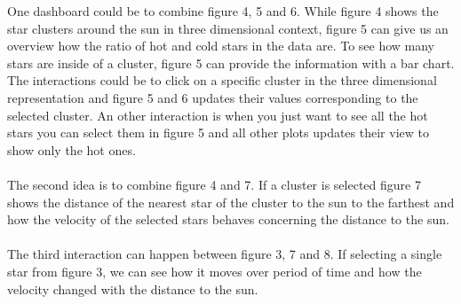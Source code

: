\documentclass{article}
\begin{document}
One dashboard could be to combine figure 4, 5 and 6. While figure 4 shows the star clusters around the sun in three dimensional context, figure 5 can give us an overview how the ratio of hot and cold stars in the data are. To see how many stars are inside of a cluster, figure 5 can provide the information with a bar chart. The interactions could be to click on a specific cluster in the three dimensional representation and figure 5 and 6 updates their values corresponding to the selected cluster. An other interaction is when you just want to see all the hot stars you can select them in figure 5 and all other plots updates their view to show only the hot ones.\\
\\
The second idea is to combine figure 4 and 7. If a cluster is selected figure 7 shows the distance of the nearest star of the cluster to the sun to the farthest and how the velocity of the selected stars behaves concerning the distance to the sun.\\
\\
The third interaction can happen between figure 3, 7 and 8. If selecting a single star from figure 3, we can see how it moves over period of time and how the velocity changed with the distance to the sun.
\end{document}
